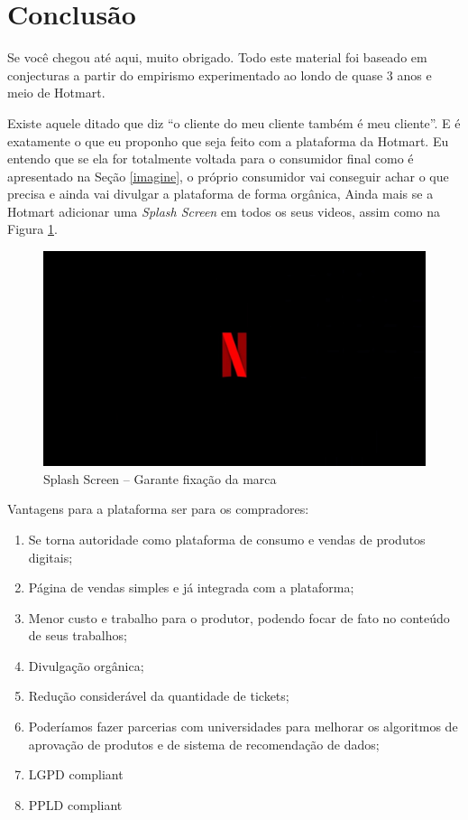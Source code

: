 \section{Conclusão}

Se você chegou até aqui, muito obrigado. Todo este material foi baseado em conjecturas a partir do empirismo experimentado ao londo de quase 3 anos e meio de Hotmart.

Existe aquele ditado que diz ``o cliente do meu cliente também é meu cliente''. E é exatamente o que eu proponho que seja feito com a plataforma da Hotmart. Eu entendo que se ela for totalmente voltada para o consumidor final como é apresentado na Seção \ref{imagine}, o próprio consumidor vai conseguir achar o que precisa e ainda vai divulgar a plataforma de forma orgânica, Ainda mais se a Hotmart adicionar uma \emph{Splash Screen} em todos os seus videos, assim como na Figura \ref{pic_12}.

\begin{figure}[H]
    \centering
    \includegraphics[scale=0.25,keepaspectratio=true]{images/12.jpg}
    \caption{Splash Screen -- Garante fixação da marca}
    \label{pic_12}
\end{figure}

Vantagens para a plataforma ser para os compradores:
\begin{enumerate}
    \item Se torna autoridade como plataforma de consumo e vendas de produtos digitais;
    \item Página de vendas simples e já integrada com a plataforma;
    \item Menor custo e trabalho para o produtor, podendo focar de fato no conteúdo de seus trabalhos;
    \item Divulgação orgânica;
    \item Redução considerável da quantidade de tickets;
    \item Poderíamos fazer parcerias com universidades para melhorar os algoritmos de aprovação de produtos e de sistema de recomendação de dados;
    \item LGPD compliant
    \item PPLD compliant
\end{enumerate}

